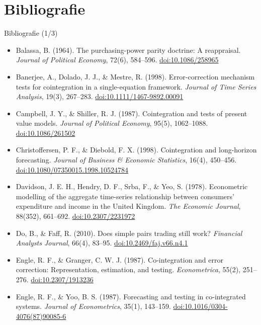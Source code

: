 \section{Bibliografie}

\begin{frame}{Bibliografie (1/3)}
\itemsize{\scriptsize}
\begin{itemize}
    \item Balassa, B. (1964). The purchasing-power parity doctrine: A reappraisal. \textit{Journal of Political Economy}, 72(6), 584--596. \href{https://doi.org/10.1086/258965}{doi:10.1086/258965}
    \item Banerjee, A., Dolado, J. J., \& Mestre, R. (1998). Error-correction mechanism tests for cointegration in a single-equation framework. \textit{Journal of Time Series Analysis}, 19(3), 267--283. \href{https://doi.org/10.1111/1467-9892.00091}{doi:10.1111/1467-9892.00091}
    \item Campbell, J. Y., \& Shiller, R. J. (1987). Cointegration and tests of present value models. \textit{Journal of Political Economy}, 95(5), 1062--1088. \href{https://doi.org/10.1086/261502}{doi:10.1086/261502}
    \item Christoffersen, P. F., \& Diebold, F. X. (1998). Cointegration and long-horizon forecasting. \textit{Journal of Business \& Economic Statistics}, 16(4), 450--456. \href{https://doi.org/10.1080/07350015.1998.10524784}{doi:10.1080/07350015.1998.10524784}
    \item Davidson, J. E. H., Hendry, D. F., Srba, F., \& Yeo, S. (1978). Econometric modelling of the aggregate time-series relationship between consumers' expenditure and income in the United Kingdom. \textit{The Economic Journal}, 88(352), 661--692. \href{https://doi.org/10.2307/2231972}{doi:10.2307/2231972}
    \item Do, B., \& Faff, R. (2010). Does simple pairs trading still work? \textit{Financial Analysts Journal}, 66(4), 83--95. \href{https://doi.org/10.2469/faj.v66.n4.1}{doi:10.2469/faj.v66.n4.1}
    \item Engle, R. F., \& Granger, C. W. J. (1987). Co-integration and error correction: Representation, estimation, and testing. \textit{Econometrica}, 55(2), 251--276. \href{https://doi.org/10.2307/1913236}{doi:10.2307/1913236}
    \item Engle, R. F., \& Yoo, B. S. (1987). Forecasting and testing in co-integrated systems. \textit{Journal of Econometrics}, 35(1), 143--159. \href{https://doi.org/10.1016/0304-4076(87)90085-6}{doi:10.1016/0304-4076(87)90085-6}

\end{itemize}
\end{frame}
